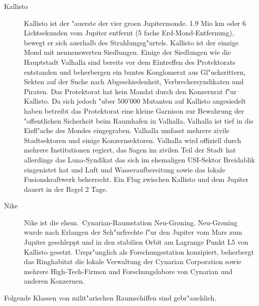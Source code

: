 \begin{description}
\item [Kallisto] Kallisto ist der "au\3erste der vier gro\3en Jupitermonde. 1.9 Mio km oder 6 Lichtsekunden vom Jupiter
      entfernt (5 fache Erd-Mond-Entfernung), bewegt er sich au\3erhalb des Strahlungsg"urtels. Kallisto ist der einzige Mond mit nennenswerten Siedlungen. Einige der Siedlungen wie die Hauptstadt Valhalla sind bereits vor dem Eintreffen des Protektorats entstanden und beherbergen ein buntes Konglomerat aus Gl"ucksrittern, Sekten auf der Suche nach Abgeschiedenheit, Verbrechersyndikaten und Piraten. Das Protektorat hat kein Mandat durch den Konzernrat f"ur Kallisto. Da sich jedoch "uber 500'000 Mutanten auf Kallisto angesiedelt haben betreibt das Protektorat eine kleine Garnison zur Bewahrung der "offentlichen Sicherheit beim Raumhafen in Valhalla. Valhalla ist tief in die Eisfl"ache des Mondes eingegraben. Valhalla umfasst mehrere zivile Stadtsektoren und einige Konzernsektoren. Valhalla wird offiziell durch mehrere Institutionen regiert, das Sagen im zivilen Teil der Stadt hat allerdings das Luna-Syndikat das sich im ehemaligen USI-Sektor Breidablik eingenistet hat und Luft und Wasseraufbereitung sowie das lokale Fusionskraftwerk beherrscht. Ein Flug zwischen Kallisto und dem Jupiter dauert in der Regel 2 Tage.
\item [Nike] Nike ist die ehem.~Cynarian-Raumstation Neu-Gr{\o}ning. Neu-Gr{\o}ning wurde nach Erlangen der
      Sch"urfrechte f"ur den Jupiter vom Mars zum Jupiter geschleppt und in den stabilien Orbit am Lagrange Punkt L5 von Kallisto gesetzt. Urspr"unglich als Forschungsstation konzipiert, beherbergt das Ringhabitat die lokale Verwaltung der Cynarian Corporation sowie mehrere High-Tech-Firmen und Forschungslabore von Cynarian und anderen Konzernen.
\end{description}


Folgende Klassen von milit"arischen Raumschiffen sind gebr"auchlich.


